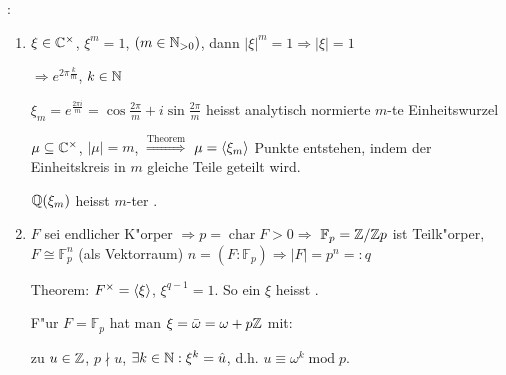 \example{}:{\begin{enumerate}
 \item $\xi \in \mathbb C^{\times}$, $\xi^m=1$, $(m\in \mathbb N_{>0})$, dann $|\xi|^m=1 \Rightarrow |\xi|=1$
 
 $\Rightarrow e^{2\pi \frac{k}{m}}$, $k\in \mathbb N$
 
 $\xi_m=e^{\frac{2\pi i}{m}}=\operatorname{cos}\frac{2\pi}{m}+i\operatorname{sin}\frac{2\pi}{m}$
 heisst analytisch normierte $m$-te Einheitswurzel
 
 $\mu \subseteq \mathbb C^{\times}$, $|\mu|=m$, $\stackrel{\operatorname{Theorem}}{\Rightarrow}$
 $\mu={\left\langle\xi_m\right\rangle}$ Punkte entstehen, indem der Einheitskreis in $m$ gleiche Teile geteilt wird.
 
 $\mathbb Q(\xi_m)$ heisst $m$-ter .
 \item $F$ sei endlicher K"orper $\Rightarrow p=\operatorname{char}F>0 \Rightarrow$
 $\mathbb{F}_p=\mathbb Z/ \mathbb Z p$ ist Teilk"orper, $F\cong \mathbb{F}_p^n$ (als Vektorraum)
 $n=(F:\mathbb{F}_p)\Rightarrow |F|=p^n=:q$
 
 Theorem: $F^{\times}={\left\langle\xi\right\rangle}$, $\xi^{q-1}=1$. So ein $\xi$ heisst .
 
 F"ur $F=\mathbb{F}_p$ hat man $\xi=\bar{\omega}=\omega+p\mathbb Z$ mit:
 
 zu $u\in \mathbb Z$, $p\nmid u$, $\exists k\in \mathbb N:\xi^k=\hat u$, d.h. $u\equiv \omega^k \operatorname{mod} p$.
 \end{enumerate}
 }

